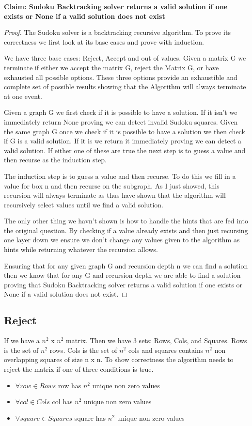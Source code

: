 \documentclass{sig-alternate}
\begin{document}
\textbf{Claim: Sudoku Backtracking solver returns a valid solution if one exists or None if a valid solution does not exist}
\begin{proof}
The Sudoku solver is a backtracking recursive algorithm. To prove its correctness we first look at its base cases and prove with induction. 

We have three base cases: Reject, Accept and out of values. Given a matrix G we terminate if either we accept the matrix G, reject the Matrix G, or have exhausted all possible options. These three options provide an exhaustible and complete set of possible results showing that the Algorithm will always terminate at one event. 

Given a graph G we first check if it is possible to have a solution. If it isn't we immediately return None proving we can detect invalid Sudoku squares. Given the same graph G once we check if it is possible to have a solution we then check if G is a valid solution. If it is we return it immediately proving we can detect a valid solution. If either one of these are true the next step is to guess a value and then recurse as the induction step.

The induction step is to  guess a value and then recurse. To do this we fill in a value for box n and then recurse on the subgraph. As I just showed, this recursion will always terminate as thus have shown that the algorithm will recursively select values until we find a valid solution. 

The only other thing we havn't shown is how to handle the hints that are fed into the original question. By checking if a value already exists and then just recursing one layer down we ensure we don't change any values given to the algorithm as hints while returning whatever the recursion allows. 

Ensuring that for any given graph G and recursion depth n we can find a solution then we know that for any G and recursion depth we are able to find a solution proving that Sudoku Backtracking solver returns a valid solution if one exists or None if a valid solution does not exist.
\end{proof}

\subsection{Reject}
If we have a $n^2$ x $n^2$ matrix. Then we have 3 sets: Rows, Cols, and Squares. Rows is the set of $n^2$ rows. Cols is the set of $n^2$ cols and squares contains $n^2$ non overlapping squares of size n x n. To show correctness the algorithm needs to reject the matrix if one of three conditions is true. 
\begin{itemize}
\item{$\forall row \in Rows$ row has $n^2$ unique non zero values}
\item{$\forall col \in Cols$ col has $n^2$ unique non zero values}
\item{$\forall square \in Squares$ square has $n^2$ unique non zero values}
\end{itemize}
\end{document}
